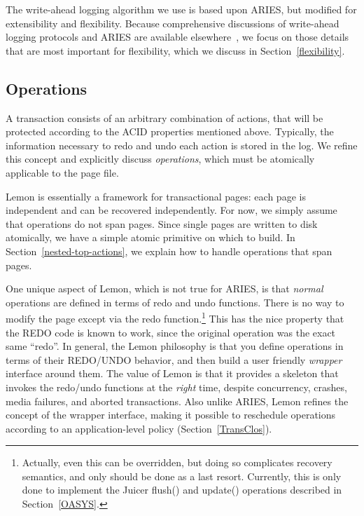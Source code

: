 \documentclass[letterpaper,twocolumn,english]{article}
\newcommand{\yad}{Lemon\xspace}
\newcommand{\oasys}{Juicer\xspace}
\begin{document}
The write-ahead logging algorithm we use is based upon ARIES, but
modified for extensibility and flexibility. Because comprehensive
discussions of write-ahead logging protocols and ARIES are available
elsewhere~\cite{haerder, aries}, we focus on those details that are
most important for flexibility, which we discuss in Section~\ref{flexibility}.


\subsection{Operations}
\label{sub:OperationProperties}

A transaction consists of an arbitrary combination of actions, that
will be protected according to the ACID properties mentioned above.
Typically, the
information necessary to redo and undo each action is stored in the
log.  We refine this concept and explicitly discuss {\em operations},
which must be atomically applicable to the page file.  

\yad is essentially a framework for transactional pages: each page is
independent and can be recovered independently. For now, we simply
assume that operations do not span pages.  Since single pages are
written to disk atomically, we have a simple atomic primitive on which
to build. In Section~\ref{nested-top-actions}, we explain how to
handle operations that span pages.

One unique aspect of \yad, which is not true for ARIES, is that {\em
normal} operations are defined in terms of redo and undo
functions. There is no way to modify the page except via the redo
function.\footnote{Actually, even this can be overridden, but doing so
complicates recovery semantics, and only should be done as a last
resort.  Currently, this is only done to implement the \oasys flush()
and update() operations described in Section~\ref{OASYS}.}  This has
the nice property that the REDO code is known to work, since the
original operation was the exact same ``redo''.  In general, the \yad
philosophy is that you define operations in terms of their REDO/UNDO
behavior, and then build a user friendly {\em wrapper} interface
around them.  The value of \yad is that it provides a skeleton that
invokes the redo/undo functions at the {\em right} time, despite
concurrency, crashes, media failures, and aborted transactions.  Also
unlike ARIES, \yad refines the concept of the wrapper interface,
making it possible to reschedule operations according to an
application-level policy (Section~\ref{TransClos}).
\end{document}
